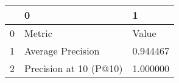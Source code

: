 \begin{tabular}{lll}
\toprule
 & 0 & 1 \\
\midrule
0 & Metric & Value \\
1 & Average Precision & 0.944467 \\
2 & Precision at 10 (P@10) & 1.000000 \\
\bottomrule
\end{tabular}
